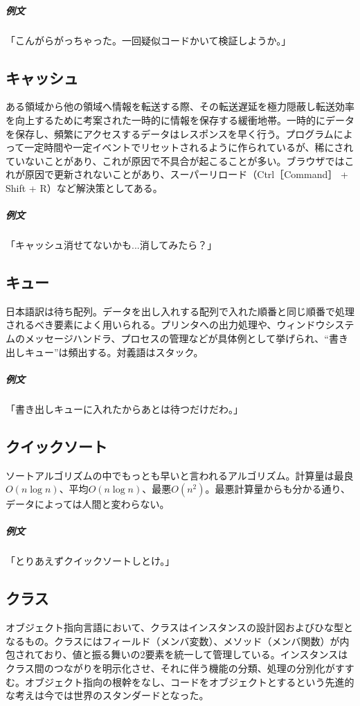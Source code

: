 \documentclass[a4paper]{ltjsreport}
\begin{document}
\subparagraph{例文} 「こんがらがっちゃった。一回疑似コードかいて検証しようか。」

\subsection{キャッシュ}
ある領域から他の領域へ情報を転送する際、その転送遅延を極力隠蔽し転送効率を向上するために考案された一時的に情報を保存する緩衝地帯。一時的にデータを保存し、頻繁にアクセスするデータはレスポンスを早く行う。プログラムによって一定時間や一定イベントでリセットされるように作られているが、稀にされていないことがあり、これが原因で不具合が起こることが多い。ブラウザではこれが原因で更新されないことがあり、スーパーリロード（Ctrl［Command］ + Shift + R）など解決策としてある。

\subparagraph{例文} 「キャッシュ消せてないかも...消してみたら？」

\subsection{キュー}
日本語訳は待ち配列。データを出し入れする配列で入れた順番と同じ順番で処理されるべき要素によく用いられる。プリンタへの出力処理や、ウィンドウシステムのメッセージハンドラ、プロセスの管理などが具体例として挙げられ、``書き出しキュー''は頻出する。対義語はスタック。

\subparagraph{例文} 「書き出しキューに入れたからあとは待つだけだわ。」

\subsection{クイックソート}
ソートアルゴリズムの中でもっとも早いと言われるアルゴリズム。計算量は最良$O(n\log n)$、平均$O(n\log n)$、最悪$O(n^2)$。最悪計算量からも分かる通り、データによっては人間と変わらない。

\subparagraph{例文} 「とりあえずクイックソートしとけ。」

\subsection{クラス}
オブジェクト指向言語において、クラスはインスタンスの設計図およびひな型となるもの。クラスにはフィールド（メンバ変数）、メソッド（メンバ関数）が内包されており、値と振る舞いの2要素を統一して管理している。インスタンスはクラス間のつながりを明示化させ、それに伴う機能の分類、処理の分別化がすすむ。オブジェクト指向の根幹をなし、コードをオブジェクトとするという先進的な考えは今では世界のスタンダードとなった。
\\
\end{document}
